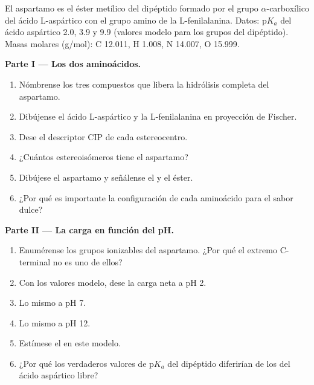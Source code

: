 \begin{problem}
\label{pb:b2:biomolecules:1}
El aspartamo es el éster metílico del dipéptido formado por el grupo $\alpha$-carboxílico del ácido L-aspártico
con el grupo amino de la L-fenilalanina. Datos: $\mathrm pK_a$ del ácido aspártico 2.0, 3.9 y 9.9 (valores
modelo para los grupos del dipéptido). Masas molares (\unit{g/mol}): C 12.011, H 1.008, N 14.007,
O 15.999.

\medskip
\noindent\textbf{Parte I --- Los dos aminoácidos.}
\begin{enumerate}
  \item Nómbrense los tres compuestos que libera la hidrólisis completa del aspartamo.
  \item Dibújense el ácido L-aspártico y la L-fenilalanina en proyección de Fischer.
  \item Dese el descriptor CIP de cada estereocentro.
  \item ¿Cuántos estereoisómeros tiene el aspartamo?
  \item Dibújese el aspartamo y señálense el  y el éster.
  \item ¿Por qué es importante la configuración de cada aminoácido para el sabor dulce?
\end{enumerate}

\medskip
\noindent\textbf{Parte II --- La carga en función del pH.}
\begin{enumerate}[resume]
  \item Enumérense los grupos ionizables del aspartamo. ¿Por qué el extremo C-terminal no es uno de ellos?
  \item Con los valores modelo, dese la carga neta a pH 2.
  \item Lo mismo a pH 7.
  \item Lo mismo a pH 12.
  \item Estímese el  en este modelo.
  \item ¿Por qué los verdaderos valores de $\mathrm pK_a$ del dipéptido diferirían de los del ácido aspártico
        libre?
\end{enumerate}


\end{problem}
